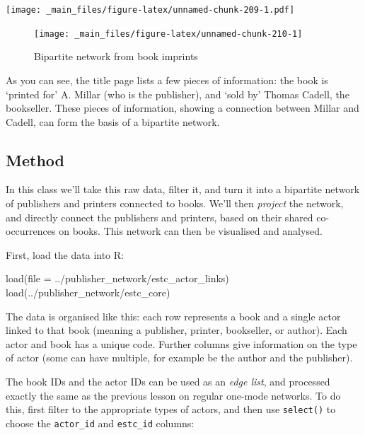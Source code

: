 \documentclass[
]{book}
\newenvironment{Shaded}{\begin{snugshade}}{\end{snugshade}}
\newcommand{\AttributeTok}[1]{\textcolor[rgb]{0.77,0.63,0.00}{#1}}
\newcommand{\FunctionTok}[1]{\textcolor[rgb]{0.00,0.00,0.00}{#1}}
\newcommand{\NormalTok}[1]{#1}
\newcommand{\StringTok}[1]{\textcolor[rgb]{0.31,0.60,0.02}{#1}}
\begin{document}
\texttt{[image: \_main\_files/figure-latex/unnamed-chunk-209-1.pdf]}

\begin{figure}
\texttt{[image: \_main\_files/figure-latex/unnamed-chunk-210-1]} \caption{Bipartite network from book imprints}\label{fig:unnamed-chunk-210}
\end{figure}

As you can see, the title page lists a few pieces of information: the book is `printed for' A. Millar (who is the publisher), and `sold by' Thomas Cadell, the bookseller. These pieces of information, showing a connection between Millar and Cadell, can form the basis of a bipartite network.

\hypertarget{method}{%
\subsection{Method}\label{method}}

In this class we'll take this raw data, filter it, and turn it into a bipartite network of publishers and printers connected to books. We'll then \emph{project} the network, and directly connect the publishers and printers, based on their shared co-occurrences on books. This network can then be visualised and analysed.

First, load the data into R:

\begin{Shaded}
\begin{Highlighting}[]
\FunctionTok{load}\NormalTok{(}\AttributeTok{file =} \StringTok{\textquotesingle{}../publisher\_network/estc\_actor\_links\textquotesingle{}}\NormalTok{)}
\FunctionTok{load}\NormalTok{(}\StringTok{\textquotesingle{}../publisher\_network/estc\_core\textquotesingle{}}\NormalTok{)}
\end{Highlighting}
\end{Shaded}

The data is organised like this: each row represents a book and a single actor linked to that book (meaning a publisher, printer, bookseller, or author). Each actor and book has a unique code. Further columns give information on the type of actor (some can have multiple, for example be the author and the publisher).

The book IDs and the actor IDs can be used as an \emph{edge list}, and processed exactly the same as the previous lesson on regular one-mode networks. To do this, first filter to the appropriate types of actors, and then use \texttt{select()} to choose the \texttt{actor\_id} and \texttt{estc\_id} columns:
\end{document}
